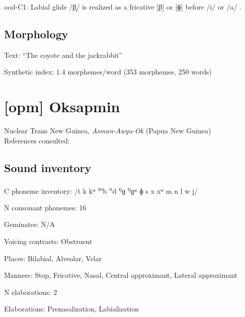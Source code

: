 {\begin{appendixdesc}
\item[ood-C1:] Labial glide /β̞/ is realized as a fricative [β] or [ɸ] before /i/ or /a/ \citep[31]{Saxton1963}.
\end{appendixdesc}
\subsection*{Morphology}

\begin{appendixdesc}

\item[Text:] “The coyote and the jackrabbit” \citep[263--266]{Saxton1982}

\item[Synthetic index:] 1.4 morphemes/word (353 morphemes, 250 words)
\end{appendixdesc}
\section*{[opm] Oksapmin}  %
Nuclear Trans New Guinea, \textit{Asman-Awyu-Ok} (Papua New Guinea)\medskip\\
References consulted: \citet{Loughnane2009}

\subsection*{Sound inventory}
\begin{appendixdesc}

\item[C phoneme inventory:] /t k kʷ \textsuperscript{m}b \textsuperscript{n}d \textsuperscript{ŋ}ɡ \textsuperscript{ŋ}ɡʷ ɸ s x xʷ m n l w j/

\item[N consonant phonemes:] 16

\item[Geminates:] N/A

\item[Voicing contrasts:] Obstruent

\item[Places:] Bilabial, Alveolar, Velar

\item[Manners:] Stop, Fricative, Nasal, Central approximant, Lateral approximant

\item[N elaborations:] 2

\item[Elaborations:] Prenasalization, Labialization


\end{appendixdesc}}
